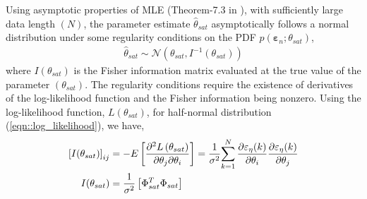 \documentclass[subscriptcorrection,upint,varvw,barcolor=Goldenrod3,mathalfa=cal=euler,balance,hyphenate,french,pdf-a]{asmejour}
\newcommand{\lr}[1]{\left( #1 \right)}
\newcommand{\lrb}[1]{\left[ #1 \right]}
\begin{document}
Using asymptotic properties of MLE (Theorem-7.3 in \cite{kay1993estimation}), with sufficiently large data length
$(N)$, the parameter estimate $\hat \theta_{sat}$ asymptotically follows a normal distribution under some regularity
conditions on the PDF $p(\pmb \varepsilon_n; \theta_{sat})$,
\begin{align}
        \hat \theta_{sat} \sim \mathcal{N} \lr{\theta_{sat},  I^{-1}(\theta_{sat})}
        \label{eqn::theta_dist}
\end{align}
where $I(\theta_{sat})$ is the Fisher information matrix evaluated at the true value of the parameter $(\theta_{sat})$.
The regularity conditions require the existence of derivatives of the log-likelihood function and the Fisher information
being nonzero. Using the log-likelihood function, $L(\theta_{sat})$, for half-normal distribution
(\ref{eqn::log_likelihood}), we have,
\begin{align}
        \lrb{I(\theta_{sat})}_{ij} & = -E \lrb{\frac{\partial^2 L\lr{\theta_{sat}}}{\partial \theta_j
        \partial \theta_i}} = \frac{1}{\sigma^2} {\sum_{k=1}^{N} \frac{\partial \varepsilon_\eta(k)}{\partial \theta_i}\frac{\partial \varepsilon_\eta(k)}{\partial \theta_j}} \notag \\
        I(\theta_{sat})            & = \frac{1}{\sigma^2} \lrb{\Phi_{sat}^T \Phi_{sat}}
        \label{eqn::fisher_information}
\end{align}
\end{document}

